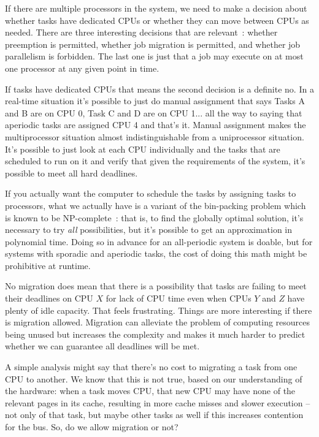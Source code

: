 If there are multiple processors in the system, we need to make a decision about whether tasks have dedicated CPUs or whether they can move between CPUs as needed. There are three interesting decisions that are relevant~\cite{sa-rt}: whether preemption is permitted, whether job migration is permitted, and whether job parallelism is forbidden. The last one is just that a job may execute on at most one processor at any given point in time.

If tasks have dedicated CPUs that means the second decision is a definite no.  In a real-time situation it's possible to just do manual assignment that says Tasks A and B are on CPU 0, Task C and D are on CPU 1... all the way to saying that aperiodic tasks are assigned CPU 4 and that's it. Manual assignment makes the multiprocessor situation almost indistinguishable from a uniprocessor situation. It's possible to just look at each CPU individually and the tasks that are scheduled to run on it and verify that given the requirements of the system, it's possible to meet all hard deadlines.

If you actually want the computer to schedule the tasks by assigning tasks to processors, what we actually have is a variant of the bin-packing problem which is known to be NP-complete~\cite{sa-rt}: that is, to find the globally optimal solution, it's necessary to try \textit{all} possibilities, but it's possible to get an approximation in polynomial time. Doing so in advance for an all-periodic system is doable, but for systems with sporadic and aperiodic tasks, the cost of doing this math might be prohibitive at runtime. 

No migration does mean that there is a possibility that tasks are failing to meet their deadlines on CPU $X$ for lack of CPU time even when CPUs $Y$ and $Z$ have plenty of idle capacity. That feels frustrating. Things are more interesting if there is migration allowed. Migration can alleviate the problem of computing resources being unused but increases the complexity and makes it much harder to predict whether we can guarantee all deadlines will be met. 

A simple analysis might say that there's no cost to migrating a task from one CPU to another. We know that this is not true, based on our understanding of the hardware: when a task moves CPU, that new CPU may have none of the relevant pages in its cache, resulting in more cache misses and slower execution -- not only of that task, but maybe other tasks as well if this increases contention for the bus. So, do we allow migration or not?

